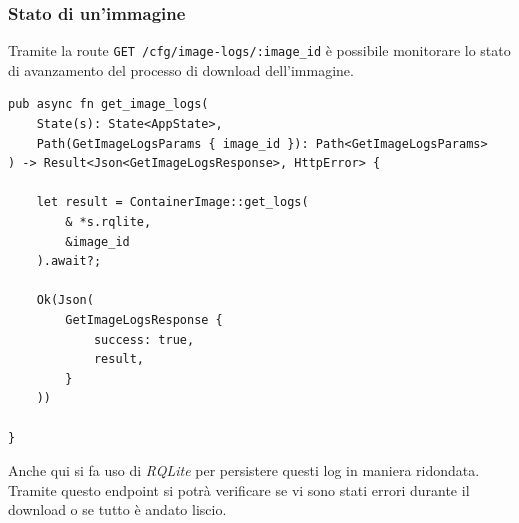\subsubsection{Stato di un'immagine}
Tramite la route \verb|GET /cfg/image-logs/:image_id| è possibile monitorare lo stato di avanzamento del processo di download dell'immagine.
\begin{verbatim}
pub async fn get_image_logs(
    State(s): State<AppState>,
    Path(GetImageLogsParams { image_id }): Path<GetImageLogsParams>
) -> Result<Json<GetImageLogsResponse>, HttpError> {

    let result = ContainerImage::get_logs(
        & *s.rqlite,
        &image_id
    ).await?;

    Ok(Json(
        GetImageLogsResponse {
            success: true,
            result,
        }
    ))

}

\end{verbatim}
Anche qui si fa uso di \textit{RQLite} per persistere questi log in maniera ridondata. Tramite questo endpoint si potrà verificare se vi sono stati errori durante il download o se tutto è andato liscio.

